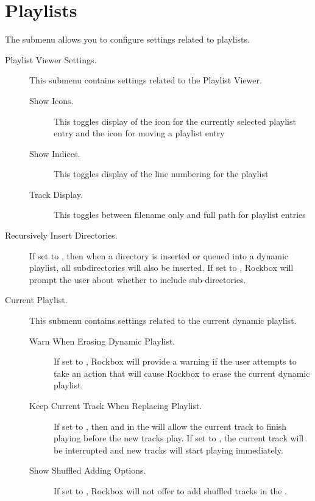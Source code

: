 \section{\label{ref:PlaylistOptions}Playlists}

The  submenu allows you to configure settings
related to playlists.


\begin{description}

\item[Playlist Viewer Settings.]
   This submenu contains settings related to the Playlist Viewer.
   \begin{description}
    \item[Show Icons.] This toggles display of the icon for the currently
    selected playlist entry and the icon for moving a playlist entry
    \item[Show Indices.] This toggles display of the line numbering for
       the playlist
    \item[Track Display.] This toggles between filename only and full path
       for playlist entries
  \end{description}

\item[Recursively Insert Directories.]
  If set to , then when a directory is inserted or queued into a
  dynamic playlist, all subdirectories will also be inserted. If set to ,
  Rockbox will prompt the user about whether to include sub-directories.

\item[Current Playlist.]
  This submenu contains settings related to the current dynamic playlist.
  \begin{description}

  \item[Warn When Erasing Dynamic Playlist.]
  If set to , Rockbox will provide a warning if the user attempts to
  take an action that will cause Rockbox to erase the current dynamic playlist.

  \item[Keep Current Track When Replacing Playlist.]
  If set to , then  and  in
  the  will allow the current track to finish
  playing before the new tracks play. If set to , the current
  track will be interrupted and new tracks will start playing immediately.

  \item[Show Shuffled Adding Options.]
  If set to , Rockbox will not offer to add shuffled tracks
  in the .


\end{description}
\end{description}
